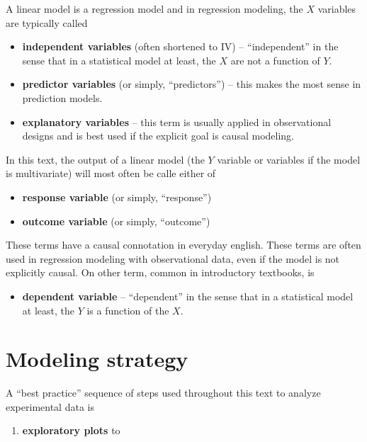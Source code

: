 \documentclass[]{book}
\providecommand{\tightlist}{%
  \setlength{\itemsep}{0pt}\setlength{\parskip}{0pt}}
\begin{document}
A linear model is a regression model and in regression modeling, the \(X\) variables are typically called

\begin{itemize}
\tightlist
\item
  \textbf{independent variables} (often shortened to IV) -- ``independent'' in the sense that in a statistical model at least, the \(X\) are not a function of \(Y\).
\item
  \textbf{predictor variables} (or simply, ``predictors'') -- this makes the most sense in prediction models.
\item
  \textbf{explanatory variables} -- this term is usually applied in observational designs and is best used if the explicit goal is causal modeling.
\end{itemize}

In this text, the output of a linear model (the \(Y\) variable or variables if the model is multivariate) will most often be calle either of

\begin{itemize}
\tightlist
\item
  \textbf{response variable} (or simply, ``response'')
\item
  \textbf{outcome variable} (or simply, ``outcome'')
\end{itemize}

These terms have a causal connotation in everyday english. These terms are often used in regression modeling with observational data, even if the model is not explicitly causal. On other term, common in introductory textbooks, is

\begin{itemize}
\tightlist
\item
  \textbf{dependent variable} -- ``dependent'' in the sense that in a statistical model at least, the \(Y\) is a function of the \(X\).
\end{itemize}

\hypertarget{modeling-strategy}{%
\section{Modeling strategy}\label{modeling-strategy}}

A ``best practice'' sequence of steps used throughout this text to analyze experimental data is

\begin{enumerate}
\def\labelenumi{\arabic{enumi}.}
\tightlist
\item
  \textbf{exploratory plots} to
\end{enumerate}
\end{document}
